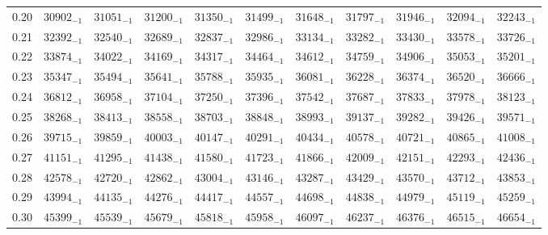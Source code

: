\documentclass[10pt, a4paper]{article}
\begin{document}
\begin{center}
\begin{longtable}{c | c c c c c | c c c c c}
        0.20 & \({30902}_{-1}\) & \({31051}_{-1}\) & \({31200}_{-1}\) & \({31350}_{-1}\) & \({31499}_{-1}\) & \({31648}_{-1}\) & \({31797}_{-1}\) & \({31946}_{-1}\) & \({32094}_{-1}\) & \({32243}_{-1}\)\\
        0.21 & \({32392}_{-1}\) & \({32540}_{-1}\) & \({32689}_{-1}\) & \({32837}_{-1}\) & \({32986}_{-1}\) & \({33134}_{-1}\) & \({33282}_{-1}\) & \({33430}_{-1}\) & \({33578}_{-1}\) & \({33726}_{-1}\)\\
        0.22 & \({33874}_{-1}\) & \({34022}_{-1}\) & \({34169}_{-1}\) & \({34317}_{-1}\) & \({34464}_{-1}\) & \({34612}_{-1}\) & \({34759}_{-1}\) & \({34906}_{-1}\) & \({35053}_{-1}\) & \({35201}_{-1}\)\\
        0.23 & \({35347}_{-1}\) & \({35494}_{-1}\) & \({35641}_{-1}\) & \({35788}_{-1}\) & \({35935}_{-1}\) & \({36081}_{-1}\) & \({36228}_{-1}\) & \({36374}_{-1}\) & \({36520}_{-1}\) & \({36666}_{-1}\)\\
        0.24 & \({36812}_{-1}\) & \({36958}_{-1}\) & \({37104}_{-1}\) & \({37250}_{-1}\) & \({37396}_{-1}\) & \({37542}_{-1}\) & \({37687}_{-1}\) & \({37833}_{-1}\) & \({37978}_{-1}\) & \({38123}_{-1}\)\\
        0.25 & \({38268}_{-1}\) & \({38413}_{-1}\) & \({38558}_{-1}\) & \({38703}_{-1}\) & \({38848}_{-1}\) & \({38993}_{-1}\) & \({39137}_{-1}\) & \({39282}_{-1}\) & \({39426}_{-1}\) & \({39571}_{-1}\)\\
        0.26 & \({39715}_{-1}\) & \({39859}_{-1}\) & \({40003}_{-1}\) & \({40147}_{-1}\) & \({40291}_{-1}\) & \({40434}_{-1}\) & \({40578}_{-1}\) & \({40721}_{-1}\) & \({40865}_{-1}\) & \({41008}_{-1}\)\\
        0.27 & \({41151}_{-1}\) & \({41295}_{-1}\) & \({41438}_{-1}\) & \({41580}_{-1}\) & \({41723}_{-1}\) & \({41866}_{-1}\) & \({42009}_{-1}\) & \({42151}_{-1}\) & \({42293}_{-1}\) & \({42436}_{-1}\)\\
        0.28 & \({42578}_{-1}\) & \({42720}_{-1}\) & \({42862}_{-1}\) & \({43004}_{-1}\) & \({43146}_{-1}\) & \({43287}_{-1}\) & \({43429}_{-1}\) & \({43570}_{-1}\) & \({43712}_{-1}\) & \({43853}_{-1}\)\\
        0.29 & \({43994}_{-1}\) & \({44135}_{-1}\) & \({44276}_{-1}\) & \({44417}_{-1}\) & \({44557}_{-1}\) & \({44698}_{-1}\) & \({44838}_{-1}\) & \({44979}_{-1}\) & \({45119}_{-1}\) & \({45259}_{-1}\)\\
        0.30 & \({45399}_{-1}\) & \({45539}_{-1}\) & \({45679}_{-1}\) & \({45818}_{-1}\) & \({45958}_{-1}\) & \({46097}_{-1}\) & \({46237}_{-1}\) & \({46376}_{-1}\) & \({46515}_{-1}\) & \({46654}_{-1}\)\\

\end{longtable}
\end{center}
\end{document}
